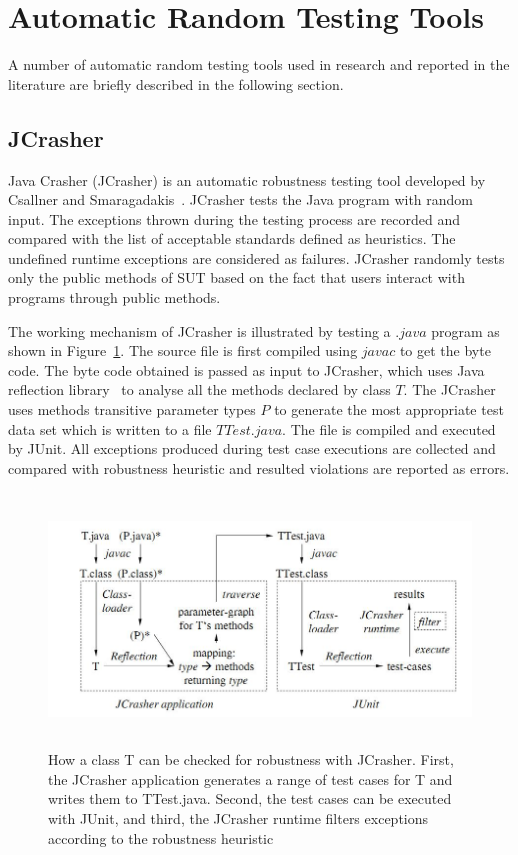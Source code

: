\section{Automatic Random Testing Tools}
A number of automatic random testing tools used in research and reported in the literature are briefly described in the following section.


\subsection{JCrasher}
Java Crasher (JCrasher) is an automatic robustness testing tool developed by Csallner and Smaragadakis~\cite{csallner2004jcrasher}. JCrasher tests the Java program with random input. The exceptions thrown during the testing process are recorded and compared with the list of acceptable standards defined as heuristics. The undefined runtime exceptions are considered as failures. JCrasher randomly tests only the public methods of SUT based on the fact that users interact with programs through public methods.

The working mechanism of JCrasher is illustrated by testing a $.java$ program as shown in Figure~\ref{fig:JCrasher}. The source file is first compiled using $javac$ to get the byte code. The byte code obtained is passed as input to JCrasher, which uses Java reflection library~\cite{chan1999java} to analyse all the methods declared by class $T$. The JCrasher uses methods transitive parameter types $P$ to generate the most appropriate test data set which is written to a file $TTest.java$. The file is compiled and executed by JUnit. All exceptions produced during test case executions are collected and compared with robustness heuristic and resulted violations are reported as errors.
\bigskip
\begin{figure}[H]
	\centering
	\includegraphics[width=14cm, height=6.7cm]{chapter2/JCrasher.png}
	\bigskip
	\caption{How a class T can be checked for robustness with JCrasher. First, the JCrasher application generates a range of test cases for T and writes them to TTest.java. Second, the test cases can be executed with JUnit, and third, the JCrasher runtime filters exceptions according to the robustness heuristic~\cite{csallner2004jcrasher}}
	\label{fig:JCrasher}
\end{figure}
\bigskip

